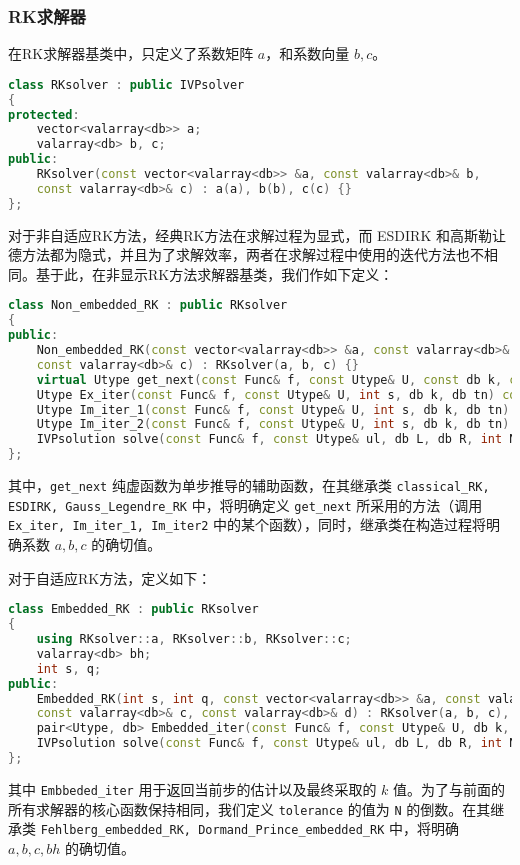 \documentclass[lang=cn,a4paper,newtx,bibend=bibtex]{elegantpaper}
\begin{document}
\subsubsection{RK求解器}
在RK求解器基类中，只定义了系数矩阵 $a$，和系数向量 $b, c$。
\begin{lstlisting}[language=C++]
class RKsolver : public IVPsolver
{
protected:
    vector<valarray<db>> a;
    valarray<db> b, c;
public:
    RKsolver(const vector<valarray<db>> &a, const valarray<db>& b, 
    const valarray<db>& c) : a(a), b(b), c(c) {}
};
\end{lstlisting}

对于非自适应RK方法，经典RK方法在求解过程为显式，而 ESDIRK 和高斯勒让德方法都为隐式，并且为了求解效率，两者在求解过程中使用的迭代方法也不相同。基于此，在非显示RK方法求解器基类，我们作如下定义：
\begin{lstlisting}[language=C++]
class Non_embedded_RK : public RKsolver
{
public:
    Non_embedded_RK(const vector<valarray<db>> &a, const valarray<db>& b, 
    const valarray<db>& c) : RKsolver(a, b, c) {}
    virtual Utype get_next(const Func& f, const Utype& U, const db k, const db t) const = 0;
    Utype Ex_iter(const Func& f, const Utype& U, int s, db k, db tn) const;
    Utype Im_iter_1(const Func& f, const Utype& U, int s, db k, db tn) const;
    Utype Im_iter_2(const Func& f, const Utype& U, int s, db k, db tn) const;
    IVPsolution solve(const Func& f, const Utype& ul, db L, db R, int N) const;
};
\end{lstlisting}
其中，\lstinline{get_next} 纯虚函数为单步推导的辅助函数，在其继承类 \lstinline{classical_RK, ESDIRK, Gauss_Legendre_RK} 中，将明确定义 \lstinline{get_next} 所采用的方法（调用 \lstinline{Ex_iter, Im_iter_1, Im_iter2} 中的某个函数），同时，继承类在构造过程将明确系数 $a, b, c$ 的确切值。

对于自适应RK方法，定义如下：
\begin{lstlisting}[language=C++]
class Embedded_RK : public RKsolver
{
    using RKsolver::a, RKsolver::b, RKsolver::c;
    valarray<db> bh;
    int s, q;
public:
    Embedded_RK(int s, int q, const vector<valarray<db>> &a, const valarray<db>& b, 
    const valarray<db>& c, const valarray<db>& d) : RKsolver(a, b, c), bh(d), s(s), q(q) {}
    pair<Utype, db> Embedded_iter(const Func& f, const Utype& U, db k, db tn, db tolerance = 1e-6) const;
    IVPsolution solve(const Func& f, const Utype& ul, db L, db R, int N) const;
};
\end{lstlisting}
其中 \lstinline{Embbeded_iter} 用于返回当前步的估计以及最终采取的 $k$ 值。为了与前面的所有求解器的核心函数保持相同，我们定义 \texttt{tolerance} 的值为 \texttt{N} 的倒数。在其继承类 \lstinline{Fehlberg_embedded_RK, Dormand_Prince_embedded_RK} 中，将明确 $a,b,c,bh$ 的确切值。
\end{document}
